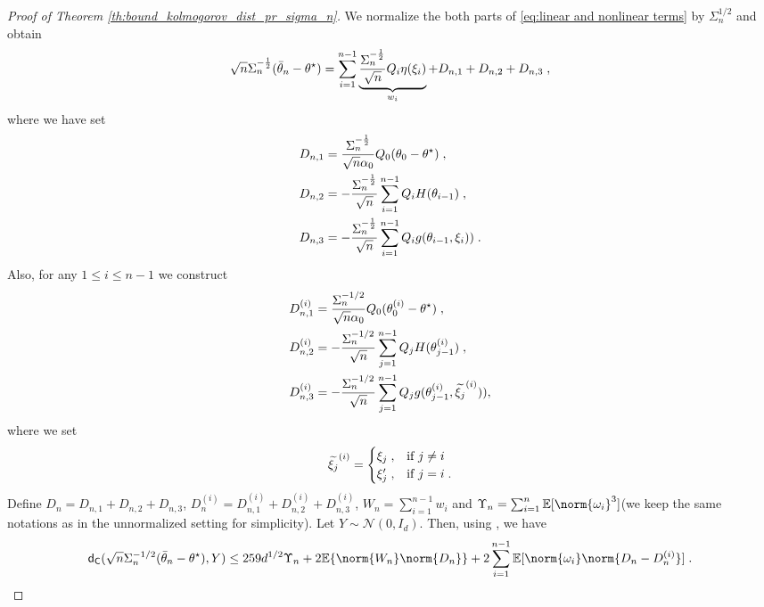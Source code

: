\begin{proof}[Proof of Theorem \ref{th:bound_kolmogorov_dist_pr_sigma_n}]
We normalize the both parts of  \eqref{eq:linear and nonlinear terms} by $\Sigma_n^{1/2}$ and obtain
\begin{equation}
    \label{eq: norm_PR_decomposition}
    \sqrt{n}\Sigma_n^{-\frac{1}{2}}(\bar\theta_n -\theta^\star) = \sum_{i=1}^{n-1}\underbrace{\frac{\Sigma_n^{-\frac{1}{2}}}{\sqrt{n}}Q_i\eta(\xi_i)}_{w_i} + D_{n,1} + D_{n,2} + D_{n,3}\;,
\end{equation}
where we have set 
\begin{equation}
\label{eq:D_n_1_3_def}
\begin{split}
D_{n,1} &= \frac{\Sigma_n^{-\frac{1}{2}}}{\sqrt{n}\alpha_0}Q_0(\theta_0-\theta^\star)\;, \\
D_{n,2} &= -\frac{\Sigma_n^{-\frac{1}{2}}}{\sqrt{n}}\sum_{i=1}^{n-1}Q_i H(\theta_{i-1})\;, \\
D_{n,3} &= -\frac{\Sigma_n^{-\frac{1}{2}}}{\sqrt{n}}\sum_{i=1}^{n-1}Q_i g(\theta_{i-1}, \xi_i)) \;.
\end{split}
\end{equation}
Also, for any $1 \leq i \leq n-1$ we construct
\begin{align}
    &D_{n,1}^{(i)} = \frac{\Sigma_n^{-1/2}}{\sqrt{n}\alpha_0}Q_0(\theta_0^{(i)}-\theta^\star) \;,\\& 
    D_{n,2}^{(i)} = -\frac{\Sigma_n^{-1/2}}{\sqrt{n}}\sum_{j=1}^{n-1}Q_jH(\theta_{j-1}^{(i)})\;,\\&
    D_{n,3}^{(i)} = -\frac{\Sigma_n^{-1/2}}{\sqrt{n}}\sum_{j=1}^{n-1}Q_jg(\theta_{j-1}^{(i)}, \widetilde{\xi_j}^{(i)})),
\end{align}
where we set
\begin{equation}
    \widetilde{\xi_j}^{(i)} =
    \begin{cases}
        \xi_j \;, &\text{if } j \neq i\\
        \xi_j' \;, &\text{if } j = i \;. 
    \end{cases}
\end{equation}
Define $D_n = D_{n,1} +  D_{n,2} +  D_{n,3}$, $D_n^{(i)}= D_{n,1}^{(i)} +  D_{n,2}^{(i)} +  D_{n,3}^{(i)}$, $W_n=\sum_{i=1}^{n-1}w_i$ and  $\Upsilon_{n} = \sum_{i=1}^n\PE[\norm{\omega_i}^3]$(we keep the same notations as in the unnormalized setting for simplicity). 
Let $Y \sim \mathcal{N}(0, I_d)$. Then, using \cite[Theorem 2.1]{shao2022berry}, we have
\begin{equation}
    \kolmogorov (\sqrt{n}\Sigma_n^{-1/2}(\bar\theta_n-\thetas), Y) \leq 259d^{1/2}\Upsilon_n + 2\PE\{\norm{W_n}\norm{D_n}\} + 2\sum_{i=1}^{n-1}\PE[\norm{\omega_i}\norm{D_n-D_n^{(i)}}]\eqsp.

\end{equation}
\end{proof}
